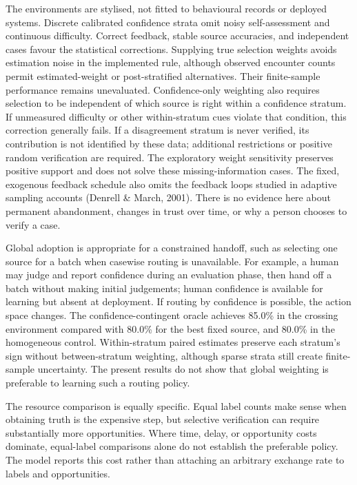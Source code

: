 \documentclass[
  british,
  11pt,
]{article}
\begin{document}
The environments are stylised, not fitted to behavioural records or
deployed systems. Discrete calibrated confidence strata omit noisy
self-assessment and continuous difficulty. Correct feedback, stable
source accuracies, and independent cases favour the statistical
corrections. Supplying true selection weights avoids estimation noise in
the implemented rule, although observed encounter counts permit
estimated-weight or post-stratified alternatives. Their finite-sample
performance remains unevaluated. Confidence-only weighting also requires
selection to be independent of which source is right within a confidence
stratum. If unmeasured difficulty or other within-stratum cues violate
that condition, this correction generally fails. If a disagreement
stratum is never verified, its contribution is not identified by these
data; additional restrictions or positive random verification are
required. The exploratory weight sensitivity preserves positive support
and does not solve these missing-information cases. The fixed, exogenous
feedback schedule also omits the feedback loops studied in adaptive
sampling accounts (Denrell \& March, 2001). There is no evidence here
about permanent abandonment, changes in trust over time, or why a person
chooses to verify a case.

Global adoption is appropriate for a constrained handoff, such as
selecting one source for a batch when casewise routing is unavailable.
For example, a human may judge and report confidence during an
evaluation phase, then hand off a batch without making initial
judgements; human confidence is available for learning but absent at
deployment. If routing by confidence is possible, the action space
changes. The confidence-contingent oracle achieves 85.0\% in the
crossing environment compared with 80.0\% for the best fixed source, and
80.0\% in the homogeneous control. Within-stratum paired estimates
preserve each stratum's sign without between-stratum weighting, although
sparse strata still create finite-sample uncertainty. The present
results do not show that global weighting is preferable to learning such
a routing policy.

The resource comparison is equally specific. Equal label counts make
sense when obtaining truth is the expensive step, but selective
verification can require substantially more opportunities. Where time,
delay, or opportunity costs dominate, equal-label comparisons alone do
not establish the preferable policy. The model reports this cost rather
than attaching an arbitrary exchange rate to labels and opportunities.
\end{document}
